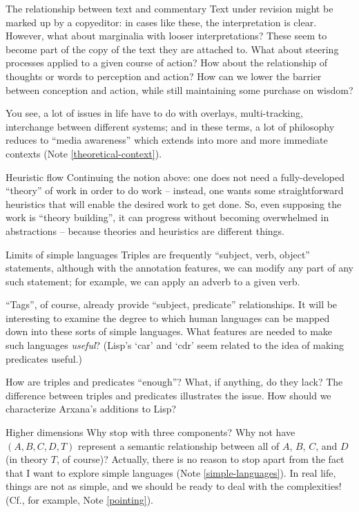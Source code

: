 \begin{notate}{The relationship between text and commentary}
Text under revision might be marked up by a copyeditor: in
cases like these, the interpretation is clear.  However,
what about marginalia with looser interpretations?  These
seem to become part of the copy of the text they are
attached to.  What about steering processes applied to a
given course of action?  How about the relationship of
thoughts or words to perception and action?  How can we
lower the barrier between conception and action, while
still maintaining some purchase on wisdom?

You see, a lot of issues in life have to do with overlays,
multi-tracking, interchange between different systems; and
in these terms, a lot of philosophy reduces to ``media
awareness'' which extends into more and more immediate
contexts (Note \ref{theoretical-context}).
\end{notate}

\begin{notate}{Heuristic flow}
Continuing the notion above: one does not need a
fully-developed ``theory'' of work in order to do work --
instead, one wants some straightforward heuristics that
will enable the desired work to get done.  So, even
supposing the work is ``theory building'', it can progress
without becoming overwhelmed in abstractions -- because
theories and heuristics are different things.
\end{notate}

\begin{notate}{Limits of simple languages} \label{simple-languages}
Triples are frequently ``subject, verb, object''
statements, although with the annotation features, we can
modify any part of any such statement; for example, we
can apply an adverb to a given verb.

``Tags'', of course, already provide ``subject,
predicate'' relationships.  It will be interesting to
examine the degree to which human languages can be mapped
down into these sorts of simple languages.  What features
are needed to make such languages \emph{useful}?  (Lisp's
`car' and `cdr' seem related to the idea of making
predicates useful.)

How are triples and predicates ``enough''?  What, if
anything, do they lack?  The difference between triples
and predicates illustrates the issue.  How should we
characterize Arxana's additions to Lisp?
\end{notate}

\begin{notate}{Higher dimensions}
Why stop with three components?  Why not have $(A, B, C,
D, T)$ represent a semantic relationship between all of
$A$, $B$, $C$, and $D$ (in theory $T$, of course)?
Actually, there is no reason to stop apart from the fact
that I want to explore simple languages (Note
\ref{simple-languages}).  In real life, things are not as
simple, and we should be ready to deal with the
complexities! (Cf., for example, Note \ref{pointing}).
\end{notate}


